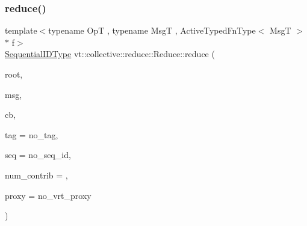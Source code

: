 \subsubsection{\texorpdfstring{reduce()}{reduce()}\hspace{0.1cm}{\footnotesize\ttfamily [2/3]}}
{\footnotesize\ttfamily template$<$typename OpT , typename MsgT , Active\+Typed\+Fn\+Type$<$ Msg\+T $>$ $\ast$ f$>$ \\
\hyperlink{namespacevt_a3063d4db3b879d6dd2c7b8d50995c7f6}{Sequential\+I\+D\+Type} vt\+::collective\+::reduce\+::\+Reduce\+::reduce (\begin{DoxyParamCaption}\item[{\hyperlink{namespacevt_a866da9d0efc19c0a1ce79e9e492f47e2}{Node\+Type} const \&}]{root,  }\item[{MsgT $\ast$}]{msg,  }\item[{\hyperlink{namespacevt_a36db99df4c973d48b1118a293fff533f}{Callback}$<$ MsgT $>$}]{cb,  }\item[{\hyperlink{namespacevt_a84ab281dae04a52a4b243d6bf62d0e52}{Tag\+Type} const \&}]{tag = {\ttfamily no\+\_\+tag},  }\item[{\hyperlink{namespacevt_a3063d4db3b879d6dd2c7b8d50995c7f6}{Sequential\+I\+D\+Type} const \&}]{seq = {\ttfamily no\+\_\+seq\+\_\+id},  }\item[{\hyperlink{structvt_1_1collective_1_1reduce_1_1_reduce_a6fd4d5e956ac5acd321e57c7dad5131f}{Reduce\+Num\+Type} const \&}]{num\+\_\+contrib = {},  }\item[{\hyperlink{namespacevt_a1b417dd5d684f045bb58a0ede70045ac}{Virtual\+Proxy\+Type} const \&}]{proxy = {\ttfamily no\+\_\+vrt\+\_\+proxy} }\end{DoxyParamCaption})}

\mbox{\label{structvt_1_1collective_1_1reduce_1_1_reduce_a526a8c10de0a179deca4f1a6961ec636}} 
